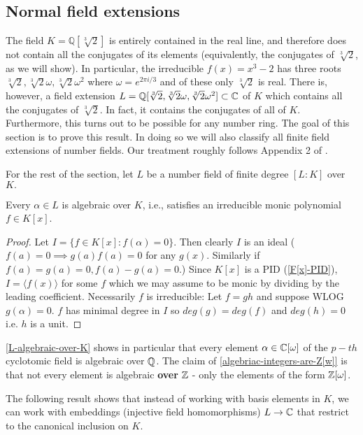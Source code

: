\subsection{Normal field extensions}
The field $K=\mathbb{Q}[\sqrt[3]{2}]$ is entirely contained in the real line, and therefore does not contain all the conjugates of its elements (equivalently, the conjugates of $\sqrt[3]{2}$, as we will show). In particular, the irreducible $f(x)=x^3-2$ has three roots $\sqrt[3]{2},\sqrt[3]{2}\omega,\sqrt[3]{2}\omega^2$ where $\omega=e^{2\pi i/3}$ and of these only $\sqrt[3]{2}$ is real. There is, however, a field extension $L=\mathbb{Q}[\sqrt[3]{2},\sqrt[3]{2}\omega,\sqrt[3]{2}\omega^2]\subset \mathbb{C}$ of $K$ which contains all the conjugates of $\sqrt[3]{2}$. In fact, it contains the conjugates of all of $K$. Furthermore, this turns out to be possible for any number ring. The goal of this section is to prove this result. In doing so we will also classify all finite field extensions of number fields. Our treatment roughly follows Appendix 2 of \cite{NumberFields}.

For the rest of the section, let $L$ be a number field of finite degree $[L:K]$ over $K.$

\begin{prop}\label{L-algebraic-over-K}
Every $\alpha \in L$ is algebraic over $K$, i.e., satisfies an irreducible monic polynomial $f\in K[x]$.
\end{prop}
\begin{proof}
Let $I=\{f\in K[x]:f(\alpha)=0\}$. Then clearly $I$ is an ideal ($f(a)=0\implies g(a)f(a)=0$ for any $g(x)$. Similarly if $f(a)=g(a)=0, f(a)-g(a)=0$.) Since $K[x]$ is a PID (\cref{F[x]-PID}), $I=\langle f(x)\rangle$ for some $f$ which we may assume to be monic by dividing by the leading coefficient. Necessarily $f$ is irreducible: Let $f=gh$ and suppose WLOG $g(\alpha)=0$. $f$ has minimal degree in $I$ so $deg(g)=deg(f)$ and $deg(h)=0$ i.e. $h$ is a unit. 
\end{proof}

\begin{warning}
\cref{L-algebraic-over-K} shows in particular that every element $\alpha\in \mathbb{C}[\omega]$ of the $p-th$ cyclotomic field is algebraic over $\mathbb{Q}$. The claim of \cref{algebriac-integers-are-Z[w]} is that not every element is algebraic \textbf{over} $\mathbf{\mathbb{Z}}$ - only the elements of the form $\mathbb{Z}[\omega]$.
\end{warning}

 The following result shows that instead of working with basis elements in $K$, we can work with embeddings (injective field homomorphisms) $L\rightarrow \mathbb{C}$ that restrict to the canonical inclusion on $K$.


